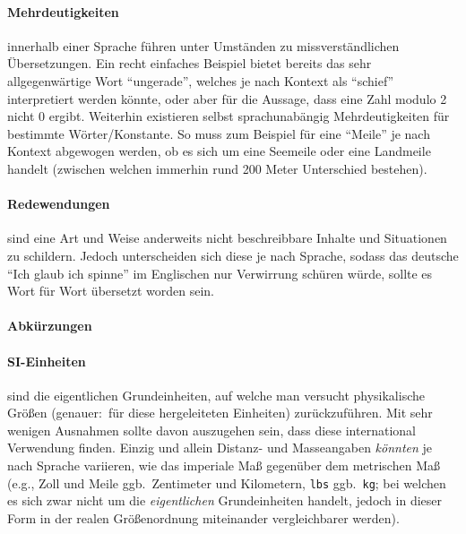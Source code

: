\paragraph*{Mehrdeutigkeiten} innerhalb einer Sprache führen unter Umständen zu missverständlichen Übersetzungen. Ein recht einfaches Beispiel bietet bereits das sehr allgegenwärtige Wort \enquote{ungerade}, welches je nach Kontext als \enquote{schief} interpretiert werden könnte, oder aber für die Aussage, dass eine Zahl modulo 2 nicht 0 ergibt. Weiterhin existieren selbst sprachunabängig Mehrdeutigkeiten für bestimmte Wörter/Konstante. So muss zum Beispiel für eine \enquote{Meile} je nach Kontext abgewogen werden, ob es sich um eine Seemeile oder eine Landmeile handelt (zwischen welchen immerhin rund 200 Meter Unterschied bestehen).  %

\paragraph*{Redewendungen} sind eine Art und Weise anderweits nicht beschreibbare Inhalte und Situationen zu schildern. Jedoch unterscheiden sich diese je nach Sprache, sodass das deutsche \enquote{Ich glaub ich spinne} im Englischen nur Verwirrung schüren würde, sollte es Wort für Wort übersetzt worden sein.

\paragraph*{Abkürzungen}

\paragraph*{SI-Einheiten}\label{par:siunits}sind die eigentlichen Grundeinheiten, auf welche man versucht physikalische Größen (genauer:\ für diese hergeleiteten Einheiten) zurückzuführen. Mit sehr wenigen Ausnahmen sollte davon auszugehen sein, dass diese international Verwendung finden. Einzig und allein %
Distanz- und Masseangaben \textit{könnten} je nach Sprache variieren, wie das imperiale Maß gegenüber dem metrischen Maß (e.g., Zoll und Meile ggb.\ Zentimeter und Kilometern, \texttt{lbs} ggb.\ \texttt{kg}; bei welchen es sich zwar nicht um die \textit{eigentlichen} Grundeinheiten handelt, jedoch in dieser Form in der realen Größenordnung miteinander vergleichbarer werden).%

